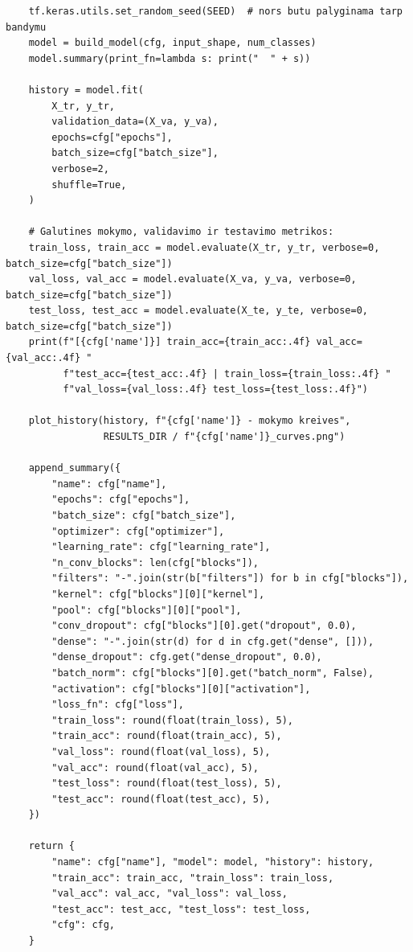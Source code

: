 \documentclass[]{VUMIFTemplateClass}
\begin{document}
\begin{verbatim}
    tf.keras.utils.set_random_seed(SEED)  # nors butu palyginama tarp bandymu
    model = build_model(cfg, input_shape, num_classes)
    model.summary(print_fn=lambda s: print("  " + s))

    history = model.fit(
        X_tr, y_tr,
        validation_data=(X_va, y_va),
        epochs=cfg["epochs"],
        batch_size=cfg["batch_size"],
        verbose=2,
        shuffle=True,
    )

    # Galutines mokymo, validavimo ir testavimo metrikos:
    train_loss, train_acc = model.evaluate(X_tr, y_tr, verbose=0, batch_size=cfg["batch_size"])
    val_loss, val_acc = model.evaluate(X_va, y_va, verbose=0, batch_size=cfg["batch_size"])
    test_loss, test_acc = model.evaluate(X_te, y_te, verbose=0, batch_size=cfg["batch_size"])
    print(f"[{cfg['name']}] train_acc={train_acc:.4f} val_acc={val_acc:.4f} "
          f"test_acc={test_acc:.4f} | train_loss={train_loss:.4f} "
          f"val_loss={val_loss:.4f} test_loss={test_loss:.4f}")

    plot_history(history, f"{cfg['name']} - mokymo kreives",
                 RESULTS_DIR / f"{cfg['name']}_curves.png")

    append_summary({
        "name": cfg["name"],
        "epochs": cfg["epochs"],
        "batch_size": cfg["batch_size"],
        "optimizer": cfg["optimizer"],
        "learning_rate": cfg["learning_rate"],
        "n_conv_blocks": len(cfg["blocks"]),
        "filters": "-".join(str(b["filters"]) for b in cfg["blocks"]),
        "kernel": cfg["blocks"][0]["kernel"],
        "pool": cfg["blocks"][0]["pool"],
        "conv_dropout": cfg["blocks"][0].get("dropout", 0.0),
        "dense": "-".join(str(d) for d in cfg.get("dense", [])),
        "dense_dropout": cfg.get("dense_dropout", 0.0),
        "batch_norm": cfg["blocks"][0].get("batch_norm", False),
        "activation": cfg["blocks"][0]["activation"],
        "loss_fn": cfg["loss"],
        "train_loss": round(float(train_loss), 5),
        "train_acc": round(float(train_acc), 5),
        "val_loss": round(float(val_loss), 5),
        "val_acc": round(float(val_acc), 5),
        "test_loss": round(float(test_loss), 5),
        "test_acc": round(float(test_acc), 5),
    })

    return {
        "name": cfg["name"], "model": model, "history": history,
        "train_acc": train_acc, "train_loss": train_loss,
        "val_acc": val_acc, "val_loss": val_loss,
        "test_acc": test_acc, "test_loss": test_loss,
        "cfg": cfg,
    }



\end{verbatim}
\end{document}
